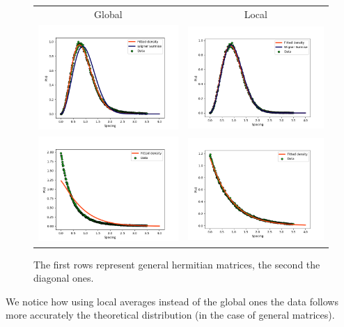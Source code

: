 \documentclass{article}
\begin{document}
\begin{center}
	\begin{figure}[h!]
		\begin{tabular}{cc}
			Global & Local \\
			\includegraphics[width=0.5\linewidth]{pdf_2000_150_300_0_0.png} &
			\includegraphics[width=0.5\linewidth]{pdf_2000_150_300_0_1.png} \\
			\includegraphics[width=0.5\linewidth]{pdf_2000_150_300_1_0.png} &
			\includegraphics[width=0.5\linewidth]{pdf_2000_150_300_1_1.png} \\
		\end{tabular}
		\caption{The first rows represent general hermitian matrices, the second the diagonal ones.}
	\end{figure}
\end{center}
We notice how using local averages instead of the global ones the data follows more accurately the theoretical distribution (in the case of general matrices).
\end{document}
